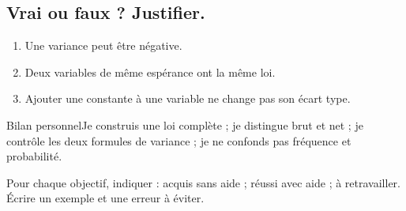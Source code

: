 \subsection*{Vrai ou faux ? Justifier.}\label{C08-VF}
\begin{enumerate}
\item Une variance peut être négative.
\item Deux variables de même espérance ont la même loi.
\item Ajouter une constante à une variable ne change pas son écart type.
\end{enumerate}
\begin{repere}{Bilan personnel}Je construis une loi complète ; je distingue brut et net ; je contrôle les deux formules de variance ; je ne confonds pas fréquence et probabilité.

Pour chaque objectif, indiquer : acquis sans aide ; réussi avec aide ; à retravailler. Écrire un exemple et une erreur à éviter.\end{repere}
\endgroup
\ifprof\fi
